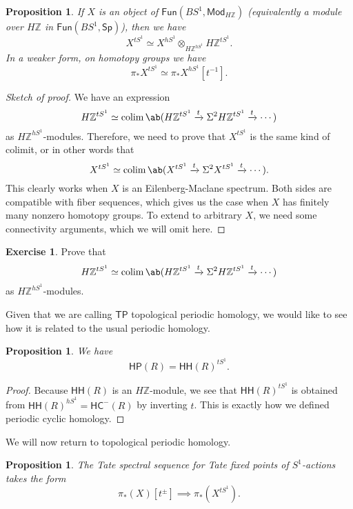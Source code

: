 \documentclass[10pt, oneside]{memoir}
\newtheorem{prop}[thm]{Proposition}
\theoremstyle{definition}
\newtheorem{exer}[thm]{Exercise}
\theoremstyle{remark}
\theoremstyle{plain}
\theoremstyle{definition}
\theoremstyle{remark}
\newcommand{\Z}{\mathbb{Z}}
\newcommand{\ms}[1]{\mathsf{#1}}
\newcommand{\1}{\mathbf{1}}
\newcommand{\2}{\mathbf{2}}
\newcommand{\3}{\mathbf{3}}
\newcommand{\HC}{\ms{HC}}
\newcommand{\TP}{\ms{TP}}
\newcommand{\HH}{\ms{HH}}
\newcommand{\HP}{\ms{HP}}
\DeclareMathOperator*{\colim}{colim}
\begin{document}
\begin{prop}
    If $X$ is an object of $\ms{Fun}(BS^1, \ms{Mod}_{H\Z})$ (equivalently a module over $H\Z$ in $\ms{Fun}(BS^1, \ms{Sp})$), then we have
    \[ X^{t S^1} \simeq X^{hS^1} \otimes_{H\Z^{hS^1}} H\Z^{tS^1}. \]
    In a weaker form, on homotopy groups we have
    \[ \pi_* X^{tS^1} \simeq \pi_* X^{hS^1}[t^{-1}]. \]
\end{prop}

\begin{proof}[Sketch of proof]
    We have an expression
    \[ H\Z^{tS^1} \simeq \colim \ab(H\Z^{tS^1} \xrightarrow{t} \Sigma^2 H\Z^{tS^1} \xrightarrow{t} \cdots) \]
    as $H\Z^{hS^1}$-modules. Therefore, we need to prove that $X^{tS^1}$ is the same kind of colimit, or in other words that
    \[ X^{tS^1} \simeq \colim \ab(X^{tS^1} \xrightarrow{t} \Sigma^2 X^{tS^1} \xrightarrow{t} \cdots). \]
    This clearly works when $X$ is an Eilenberg-Maclane spectrum. Both sides are compatible with fiber sequences, which gives us the case when $X$ has finitely many nonzero homotopy groups. To extend to arbitrary $X$, we need some connectivity arguments, which we will omit here.
\end{proof}

\begin{exer}
    Prove that
    \[ H\Z^{tS^1} \simeq \colim \ab(H\Z^{tS^1} \xrightarrow{t} \Sigma^2 H\Z^{tS^1} \xrightarrow{t} \cdots) \]
    as $H\Z^{hS^1}$-modules.
\end{exer}

Given that we are calling $\TP$ topological periodic homology, we would like to see how it is related to the usual periodic homology.

\begin{prop}
    We have
    \[ \HP(R) = \HH(R)^{tS^1}. \]
\end{prop}

\begin{proof}
    Because $\HH(R)$ is an $H\Z$-module, we see that $\HH(R)^{tS^1}$ is obtained from $\HH(R)^{hS^1} = \HC^-(R)$ by inverting $t$. This is exactly how we defined periodic cyclic homology.
\end{proof}

We will now return to topological periodic homology.

\begin{prop}
    The Tate spectral sequence for Tate fixed points of $S^1$-actions takes the form
    \[ \pi_*(X)[t^{\pm}] \implies \pi_* (X^{tS^1}). \]
\end{prop}
\end{document}
